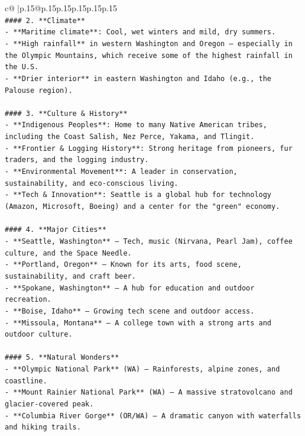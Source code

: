 \documentclass{article}
\begin{document}
{\begin{supertabular}{c@{$\;$}|p{.15\linewidth}@{}p{.15\linewidth}p{.15\linewidth}p{.15\linewidth}p{.15\linewidth}p{.15\linewidth}}
{{{\\ 
\texttt{\#\#\#\# 2. **Climate**} \\
\texttt{{-} **Maritime climate**: Cool, wet winters and mild, dry summers.} \\
\texttt{{-} **High rainfall** in western Washington and Oregon — especially in the Olympic Mountains, which receive some of the highest rainfall in the U.S.} \\
\texttt{{-} **Drier interior** in eastern Washington and Idaho (e.g., the Palouse region).} \\
\\ 
\texttt{\#\#\#\# 3. **Culture \& History**} \\
\texttt{{-} **Indigenous Peoples**: Home to many Native American tribes, including the Coast Salish, Nez Perce, Yakama, and Tlingit.} \\
\texttt{{-} **Frontier \& Logging History**: Strong heritage from pioneers, fur traders, and the logging industry.} \\
\texttt{{-} **Environmental Movement**: A leader in conservation, sustainability, and eco{-}conscious living.} \\
\texttt{{-} **Tech \& Innovation**: Seattle is a global hub for technology (Amazon, Microsoft, Boeing) and a center for the "green" economy.} \\
\\ 
\texttt{\#\#\#\# 4. **Major Cities**} \\
\texttt{{-} **Seattle, Washington** – Tech, music (Nirvana, Pearl Jam), coffee culture, and the Space Needle.} \\
\texttt{{-} **Portland, Oregon** – Known for its arts, food scene, sustainability, and craft beer.} \\
\texttt{{-} **Spokane, Washington** – A hub for education and outdoor recreation.} \\
\texttt{{-} **Boise, Idaho** – Growing tech scene and outdoor access.} \\
\texttt{{-} **Missoula, Montana** – A college town with a strong arts and outdoor culture.} \\
\\ 
\texttt{\#\#\#\# 5. **Natural Wonders**} \\
\texttt{{-} **Olympic National Park** (WA) – Rainforests, alpine zones, and coastline.} \\
\texttt{{-} **Mount Rainier National Park** (WA) – A massive stratovolcano and glacier{-}covered peak.} \\
\texttt{{-} **Columbia River Gorge** (OR/WA) – A dramatic canyon with waterfalls and hiking trails.} \\
}}}
\end{supertabular}}
\end{document}
